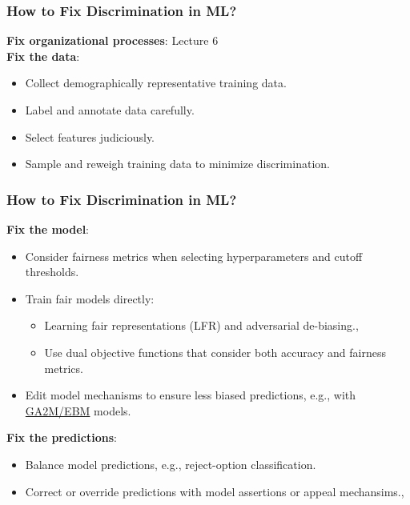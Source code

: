 \documentclass[11pt,aspectratio=169,hyperref={colorlinks}]{beamer}
\begin{document}
		\begin{frame}			
		
			\frametitle{How to Fix Discrimination in ML?}
			\Large \noindent 
			\textbf{Fix organizational processes}: Lecture 6\\
			\noindent 
			\textbf{Fix the data}:
			\begin{itemize}
				\item Collect demographically representative training data.
				\item Label and annotate data carefully.
				\item Select features judiciously.
				\item Sample and reweigh training data to minimize discrimination.\cite{kamiran2012data}
			\end{itemize}
			
		\end{frame}	
		
			
		\begin{frame}			
		
			\frametitle{How to Fix Discrimination in ML?}			
			
			\noindent 
			\textbf{Fix the model}:
			\begin{itemize}
				\item Consider fairness metrics when selecting hyperparameters and cutoff thresholds.
				\item Train fair models directly:
				\begin{itemize}
					\item Learning fair representations (LFR) and adversarial de-biasing.\cite{zemel2013learning}, \cite{zhang2018mitigating}
					\item Use dual objective functions that consider both accuracy and fairness metrics.
				\end{itemize}
				\item Edit model mechanisms to ensure less biased predictions, e.g., with \href{https://github.com/interpretml/interpret}{GA2M/EBM} models.
			\end{itemize}		
			\noindent \textbf{Fix the predictions}: 
			\begin{itemize}
				\item Balance model predictions, e.g., reject-option classification.\cite{kamiran2012decision}	
				\item Correct or override predictions with model assertions or appeal mechansims.\cite{hall2019guidelines}, \cite{kangdebugging}
			\end{itemize}
			
		\end{frame}
	
\end{document}
